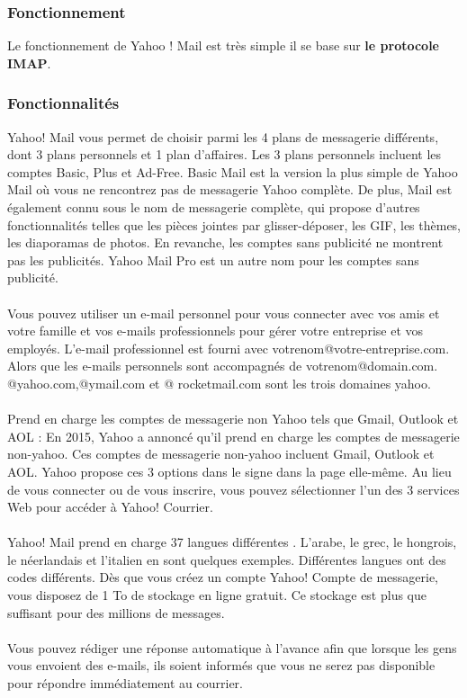\documentclass[french]{report}
\begin{document}
\subsubsection{\LARGE Fonctionnement}
\LARGE Le fonctionnement de Yahoo ! Mail est très simple il se base sur \textbf{le protocole IMAP}.
\subsubsection{\LARGE Fonctionnalités}
\LARGE Yahoo! Mail vous permet de choisir parmi les 4 plans de messagerie différents, dont 3 plans personnels et 1 plan d'affaires. Les 3 plans personnels incluent les comptes Basic, Plus et Ad-Free. Basic Mail est la version la plus simple de Yahoo Mail où vous ne rencontrez pas de messagerie Yahoo complète. De plus, Mail est également connu sous le nom de messagerie complète, qui propose d'autres fonctionnalités telles que les pièces jointes par glisser-déposer, les GIF, les thèmes, les diaporamas de photos. En revanche, les comptes sans publicité ne montrent pas les publicités. Yahoo Mail Pro est un autre nom pour les comptes sans publicité.\\ \\
Vous pouvez utiliser un e-mail personnel pour vous connecter avec vos amis et votre famille et vos e-mails professionnels pour gérer votre entreprise et vos employés. L'e-mail professionnel est fourni avec votrenom@votre-entreprise.com. Alors que les e-mails personnels sont accompagnés de votrenom@domain.com. @yahoo.com,@ymail.com et @ rocketmail.com sont les trois domaines yahoo.\\ \\
Prend en charge les comptes de messagerie non Yahoo tels que Gmail, Outlook et AOL :
En 2015, Yahoo a annoncé qu'il prend en charge les comptes de messagerie non-yahoo. Ces comptes de messagerie non-yahoo incluent Gmail, Outlook et AOL. Yahoo propose ces 3 options dans le signe dans la page elle-même. Au lieu de vous connecter ou de vous inscrire, vous pouvez sélectionner l'un des 3 services Web pour accéder à Yahoo! Courrier.\\ \\
Yahoo! Mail prend en charge 37 langues différentes . L'arabe, le grec, le hongrois, le néerlandais et l'italien en sont quelques exemples. Différentes langues ont des codes différents.
Dès que vous créez un compte Yahoo! Compte de messagerie, vous disposez de 1 To de stockage en ligne gratuit. Ce stockage est plus que suffisant pour des millions de messages.\\ \\
Vous pouvez rédiger une réponse automatique à l'avance afin que lorsque les gens vous envoient des e-mails, ils soient informés que vous ne serez pas disponible pour répondre immédiatement au courrier.
\newpage
\end{document}
